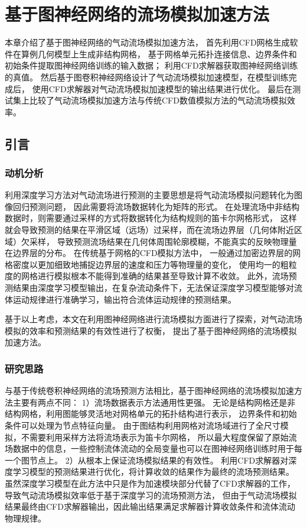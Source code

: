 \chapter{基于图神经网络的流场模拟加速方法}

本章介绍了基于图神经网络的气动流场模拟加速方法，
首先利用CFD网格生成软件在算例几何模型上生成非结构网格，
基于网格单元拓扑连接信息、边界条件和初始条件提取图神经网络训练的输入数据；
利用CFD求解器获取图神经网络训练的真值。
然后基于图卷积神经网络设计了气动流场模拟加速模型，在模型训练完成后，
使用CFD求解器对气动流场模拟加速模型的输出结果进行优化。
最后在测试集上比较了气动流场模拟加速方法与传统CFD数值模拟方法的气动流场模拟效率。

\section{引言}

\subsection{动机分析}

利用深度学习方法对气动流场进行预测的主要思想是将气动流场模拟问题转化为图像回归预测问题，
因此需要将流场数据转化为矩阵的形式。
在处理流场中非结构数据时，则需要通过采样的方式将数据转化为结构规则的笛卡尔网格形式，
这样就会导致预测的结果在平滑区域（远场）过采样，而在流场边界层（几何体附近区域）欠采样，
导致预测流场结果在几何体周围轮廓模糊，不能真实的反映物理量在边界层的分布。
在传统基于网格的CFD模拟方法中，
一般通过加密边界层的网格密度以更加细致地捕捉边界层的速度和压力等物理量的变化，
使用均一的粗粒度的网格进行模拟根本不能得到准确的结果甚至导致计算不收敛。
此外，流场预测结果由深度学习模型输出，在复杂流动条件下，无法保证深度学习模型能够对流体运动规律进行准确学习，输出符合流体运动规律的预测结果。

基于以上考虑，本文在利用图神经网络进行流场模拟方面进行了探索，对气动流场模拟的效率和预测结果的有效性进行了权衡，
提出了基于图神经网络的流场模拟加速方法。

\subsection{研究思路}
与基于传统卷积神经网络的流场预测方法相比，基于图神经网络的流场模拟加速方法主要有两点不同：
1）流场数据表示方法通用性更强。
无论是结构网格还是非结构网格，利用图能够灵活地对网格单元的拓扑结构进行表示，
边界条件和初始条件可以处理为节点特征向量。
由于图结构利用网格对流场域进行了全尺寸模拟，不需要利用采样方法将流场表示为笛卡尔网格，
所以最大程度保留了原始流场数据中的信息，一些控制流体流动的全局变量也可以在图神经网络训练时用于每一个图节点上。
2）从根本上保证流场模拟结果的有效性。
利用CFD求解器对深度学习模型的预测结果进行优化，将计算收敛的结果作为最终的流场预测结果。
虽然深度学习模型在此方法中只是作为加速模块部分代替了CFD求解器的工作，
导致气动流场模拟效率低于基于深度学习的流场预测方法，
但由于气动流场模拟结果最终由CFD求解器输出，因此输出结果满足求解器计算收敛条件和流体流动物理规律。

